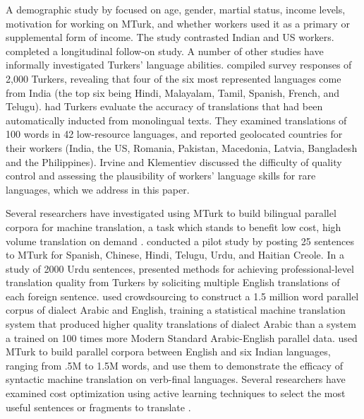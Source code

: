 \documentclass[11pt]{article}
\begin{document}
A demographic study by  focused on age, gender, martial status, income levels, motivation for working on MTurk, and whether workers used it as a primary or supplemental form of income.  The study contrasted Indian and US workers.  completed a longitudinal follow-on study. 
A number of other studies have informally investigated Turkers' language abilities.   compiled survey responses of 2,000 Turkers, revealing that four of the six most represented languages come from India (the top six being Hindi, Malayalam, Tamil, Spanish, French, and Telugu).   had Turkers evaluate the accuracy of translations that had been automatically inducted from monolingual texts.  They examined translations of 100 words in 42 low-resource languages, and reported geolocated countries for their workers (India, the US, Romania, Pakistan, Macedonia, Latvia, Bangladesh and the Philippines).  Irvine and Klementiev discussed the difficulty of quality control and assessing the plausibility of workers' language skills for rare languages, which we address in this paper. 

Several researchers have investigated using MTurk to build bilingual parallel corpora for machine translation, a task which stands to benefit low cost, high volume  translation on demand \cite{Germann2001}.   conducted a pilot study by posting 25 sentences to MTurk for Spanish, Chinese, Hindi, Telugu, Urdu, and Haitian Creole.  In a study of 2000 Urdu sentences, 
 presented methods for achieving professional-level translation quality from Turkers by soliciting multiple English translations of each foreign sentence. 
 used crowdsourcing to construct a 1.5 million word parallel corpus of dialect Arabic and English, training a statistical machine translation system that produced higher quality translations of dialect Arabic than a system a trained on 100 times more Modern Standard Arabic-English parallel data.   used MTurk to build parallel corpora between English and six Indian languages, ranging from .5M to 1.5M words, and use them to demonstrate the efficacy of syntactic machine translation on verb-final languages.  
Several researchers have examined cost optimization using active learning techniques to select the most useful sentences or fragments to translate \cite{ambati_naacl,bloodgood-callisonburch:2010:ACL,AmbatiThesis}.
\end{document}
